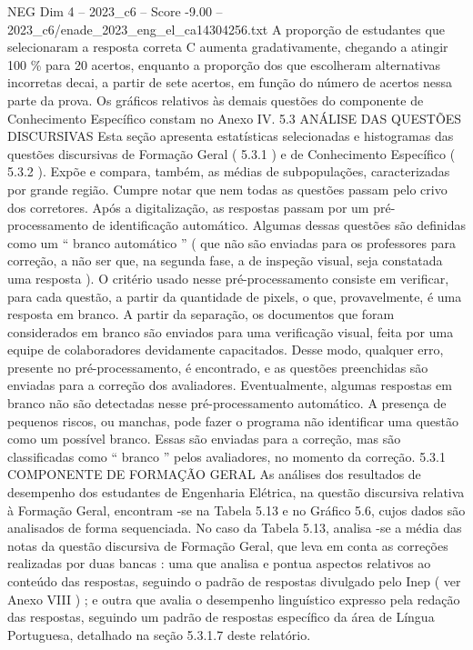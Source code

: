 \begin{textsample}{NEG Dim 4 – 2023\_c6 – Score -9.00 – 2023\_c6/enade\_2023\_eng\_el\_ca14304256.txt}
A proporção de estudantes que selecionaram a resposta correta C aumenta gradativamente, chegando a atingir 100 \% para 20 acertos, enquanto a proporção dos que escolheram alternativas incorretas decai, a partir de sete acertos, em função do número de acertos nessa parte da prova.
Os gráficos relativos às demais questões do componente de Conhecimento Específico constam no Anexo IV. 5.3 ANÁLISE DAS QUESTÕES DISCURSIVAS Esta seção apresenta estatísticas selecionadas e histogramas das questões discursivas de Formação Geral ( 5.3.1 ) e de Conhecimento Específico ( 5.3.2 ).
Expõe e compara, também, as médias de subpopulações, caracterizadas por grande região.
Cumpre notar que nem todas as questões passam pelo crivo dos corretores.
Após a digitalização, as respostas passam por um pré-processamento de identificação automático.
Algumas dessas questões são definidas como um “ branco automático ” ( que não são enviadas para os professores para correção, a não ser que, na segunda fase, a de inspeção visual, seja constatada uma resposta ).
O critério usado nesse pré-processamento consiste em verificar, para cada questão, a partir da quantidade de pixels, o que, provavelmente, é uma resposta em branco.
A partir da separação, os documentos que foram considerados em branco são enviados para uma verificação visual, feita por uma equipe de colaboradores devidamente capacitados.
Desse modo, qualquer erro, presente no pré-processamento, é encontrado, e as questões preenchidas são enviadas para a correção dos avaliadores.
Eventualmente, algumas respostas em branco não são detectadas nesse pré-processamento automático.
A presença de pequenos riscos, ou manchas, pode fazer o programa não identificar uma questão como um possível branco.
Essas são enviadas para a correção, mas são classificadas como “ branco ” pelos avaliadores, no momento da correção. 5.3.1 COMPONENTE DE FORMAÇÃO GERAL As análises dos resultados de desempenho dos estudantes de Engenharia Elétrica, na questão discursiva relativa à Formação Geral, encontram -se na Tabela 5.13 e no Gráfico 5.6, cujos dados são analisados de forma sequenciada.
No caso da Tabela 5.13, analisa -se a média das notas da questão discursiva de Formação Geral, que leva em conta as correções realizadas por duas bancas : uma que analisa e pontua aspectos relativos ao conteúdo das respostas, seguindo o padrão de respostas divulgado pelo Inep ( ver Anexo VIII ) ; e outra que avalia o desempenho linguístico expresso pela redação das respostas, seguindo um padrão de respostas específico da área de Língua Portuguesa, detalhado na seção 5.3.1.7 deste relatório.

\end{textsample}
